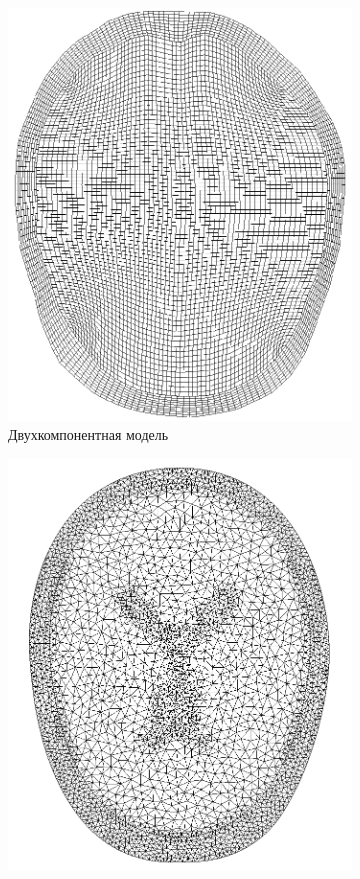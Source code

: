 \begin{figure}[h]
\centering
\begin{subfigure}[b]{0.3\textwidth}
\centering
\includegraphics[width=\textwidth]{png/cranium/2d-problem-mesh-1.png}
\caption{Двухкомпонентная модель}
\end{subfigure}
\begin{subfigure}[b]{0.3\textwidth}
\centering
\includegraphics[width=\textwidth]{png/cranium/2d-problem-mesh-2.png}

\end{subfigure}
\end{figure}
